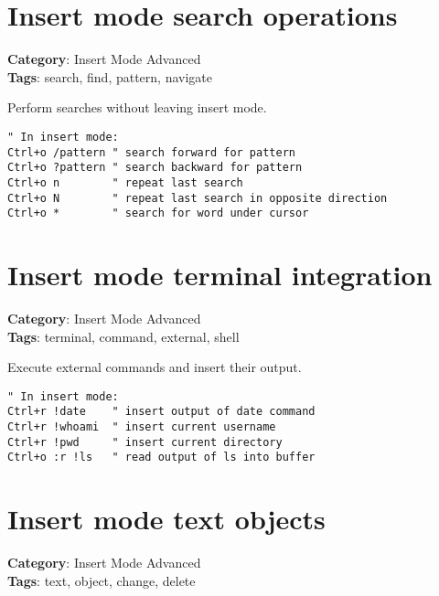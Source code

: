 {{{{{{\section{Insert mode search operations}

\textbf{Category}: Insert Mode Advanced\\ \textbf{Tags}: search, find, pattern, navigate
\vspace{0.5cm}

Perform searches without leaving insert mode.

\begin{Exa*}{}
\begin{Verbatim}[fontsize=\footnotesize, breaklines, breakanywhere]
" In insert mode:
Ctrl+o /pattern " search forward for pattern
Ctrl+o ?pattern " search backward for pattern
Ctrl+o n        " repeat last search
Ctrl+o N        " repeat last search in opposite direction
Ctrl+o *        " search for word under cursor
\end{Verbatim}
\end{Exa*}

\section{Insert mode terminal integration}

\textbf{Category}: Insert Mode Advanced\\ \textbf{Tags}: terminal, command, external, shell
\vspace{0.5cm}

Execute external commands and insert their output.

\begin{Exa*}{}
\begin{Verbatim}[fontsize=\footnotesize, breaklines, breakanywhere]
" In insert mode:
Ctrl+r !date    " insert output of date command
Ctrl+r !whoami  " insert current username
Ctrl+r !pwd     " insert current directory
Ctrl+o :r !ls   " read output of ls into buffer
\end{Verbatim}
\end{Exa*}

\section{Insert mode text objects}

\textbf{Category}: Insert Mode Advanced\\ \textbf{Tags}: text, object, change, delete
\vspace{0.5cm}

}}}}}}
